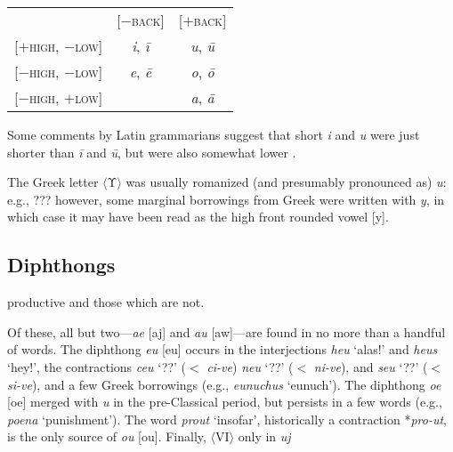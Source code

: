 \begin{example}
\label{4:monophthong-features}
\begin{tabular}{l cc}
                                          & [$-$\textsc{back}] & [$+$\textsc{back}] \\
\cmidrule{2-3}
\pad{}[$+$\textsc{high}, $-$\textsc{low}] & \emph{i}, \emph{ī} & \emph{u}, \emph{ū} \\
\pad{}[$-$\textsc{high}, $-$\textsc{low}] & \emph{e}, \emph{ē} & \emph{o}, \emph{ō} \\
\pad{}[$-$\textsc{high}, $+$\textsc{low}] &                    & \emph{a}, \emph{ā} \\
\end{tabular}
\end{example}

Some comments by Latin grammarians suggest that short \emph{i} and \emph{u} were just shorter than \emph{ī} and \emph{ū}, but were also somewhat lower
\citep[48f.]{Allen1978}.

The Greek letter $\langle$Υ$\rangle$ was usually romanized (and presumably pronounced as) \emph{u}: e.g.,
???
however, some marginal borrowings from Greek were written with \emph{y}, in which case it may have been read as the high front rounded vowel [y].




\subsection{Diphthongs}

productive and those which are not.

Of these, 
all but two---\emph{ae} [aj] and \emph{au} [aw]---are found in no more than a handful of words.
The diphthong \emph{eu} [eu] occurs in the interjections \emph{heu} `alas!' and \emph{heus} `hey!', the contractions \emph{ceu} `??' ($<$ \emph{ci-ve}) \emph{neu} `??' ($<$ \emph{ni-ve}), and \emph{seu} `??' ($<$ \emph{si-ve}), and a few Greek borrowings (e.g., \emph{eunuchus} `eunuch').
The diphthong \emph{oe} [oe] merged with \emph{u} in the pre-Classical period, but persists in a few words (e.g., \emph{poena} `punishment').
The word \emph{prout} `insofar', historically a contraction *\emph{pro-ut}, is the only source of \emph{ou} [ou].
Finally, $\langle$VI$\rangle$ only in 
\emph{uj} 


